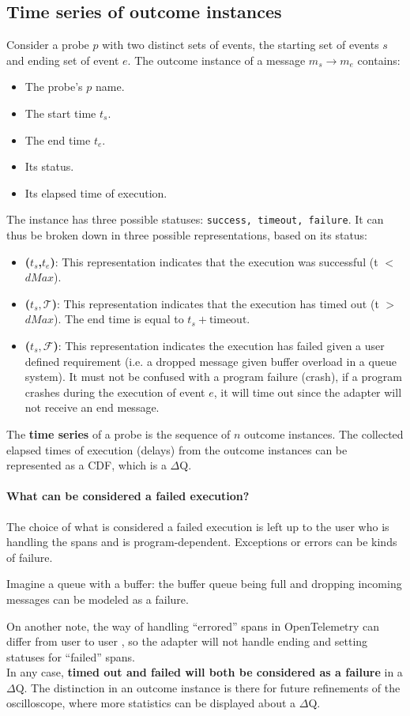 \subsection{Time series of outcome instances}
    Consider a probe $p$ with two distinct sets of events, the starting set of events $s$ and ending set of event $e$. The outcome instance of a message $m_s \rightarrow m_e$ contains:
    \begin{itemize}
        \item The probe's $p$ name.
        \item The start time $t_s$.
        \item The end time $t_e$.
        \item Its status.
        \item Its elapsed time of execution.
    \end{itemize}
    The instance has three possible statuses: \texttt{success, timeout, failure}. It can thus be broken down in three possible representations, based on its status:
    \begin{itemize}
        \item \textbf{($t_s$,$t_e$)}: This representation indicates that the execution was successful (t $<$ $dMax$). 
        \item \textbf{($t_s, \mathcal{T}$)}: This representation indicates that the execution has timed out (t $>$ $dMax$). The end time is equal to $t_s + \text{timeout}$.
        \item \textbf{($t_s, \mathcal{F}$)}: This representation indicates the execution has failed given a user defined requirement (i.e. a dropped message given buffer overload in a queue system). It must not be confused with a program failure (crash), if a program crashes during the execution of event $e$, it will time out since the adapter will not receive an end message.
    \end{itemize}
    The \textbf{time series} of a probe is the sequence of $n$ outcome instances. The collected elapsed times of execution (delays) from the outcome instances can be represented as a CDF, which is a $\Delta$Q.

    \paragraph{What can be considered a failed execution?} The choice of what is considered a failed execution is left up to the user who is handling the spans and is program-dependent. Exceptions or errors can be kinds of failure.

    Imagine a queue with a buffer: the buffer queue being full and dropping incoming messages can be modeled as a failure.

    On another note, the way of handling ``errored'' spans in OpenTelemetry can differ from user to user  \cite{otel-err}, so the adapter will not handle ending and setting statuses for ``failed'' spans. \\
   In any case, \textbf{timed out and failed will both be considered as a failure} in a $\Delta$Q. The distinction in an outcome instance is there for future refinements of the oscilloscope, where more statistics can be displayed about a $\Delta$Q.
